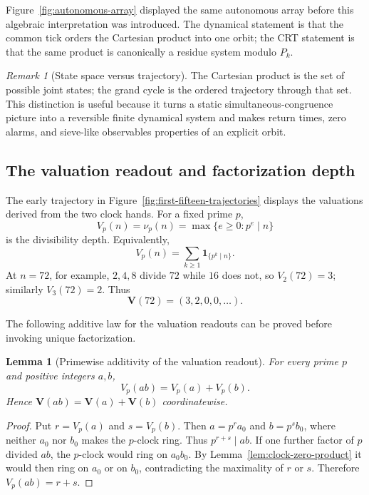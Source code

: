 \documentclass[11pt,a4paper]{article}
\theoremstyle{clockplain}
\newtheorem{lemma}[proposition]{Lemma}
\theoremstyle{definition}
\theoremstyle{remark}
\newtheorem{remark}[proposition]{Remark}
\newcommand{\V}{\mathbf V}
\begin{document}
Figure~\ref{fig:autonomous-array} displayed the same autonomous array before this algebraic interpretation was introduced. The dynamical statement is that the common tick orders the Cartesian product into one orbit; the CRT statement is that the same product is canonically a residue system modulo $P_k$.

\begin{remark}[State space versus trajectory]
The Cartesian product is the set of possible joint states; the grand cycle is the ordered trajectory through that set.  This distinction is useful because it turns a static simultaneous-congruence picture into a reversible finite dynamical system and makes return times, zero alarms, and sieve-like observables properties of an explicit orbit.
\end{remark}

\subsection{The valuation readout and factorization depth}
\label{sec:factorized-generation}

The early trajectory in Figure~\ref{fig:first-fifteen-trajectories} displays the valuations derived from the two clock hands. For a fixed prime $p$,
\[
V_p(n)=\nu_p(n)=\max\{e\ge0:p^e\mid n\}
\]
is the divisibility depth. Equivalently,
\begin{equation}
\boxed{V_p(n)=\sum_{k\ge1}\mathbf 1_{\{p^k\mid n\}}.}
\label{eq:valuation-depth}
\end{equation}
At $n=72$, for example, $2,4,8$ divide $72$ while $16$ does not, so $V_2(72)=3$; similarly $V_3(72)=2$. Thus
\[
\V(72)=(3,2,0,0,\ldots).
\]

The following additive law for the valuation readouts can be proved before invoking unique factorization.

\begin{lemma}[Primewise additivity of the valuation readout]
\label{lem:valuation-additive}
For every prime $p$ and positive integers $a,b$,
\begin{equation}
V_p(ab)=V_p(a)+V_p(b).
\label{eq:valuation-additive}
\end{equation}
Hence $\V(ab)=\V(a)+\V(b)$ coordinatewise.
\end{lemma}

\begin{proof}
Put $r=V_p(a)$ and $s=V_p(b)$. Then $a=p^r a_0$ and $b=p^s b_0$, where neither $a_0$ nor $b_0$ makes the $p$-clock ring. Thus $p^{r+s}\mid ab$. If one further factor of $p$ divided $ab$, the $p$-clock would ring on $a_0b_0$. By Lemma~\ref{lem:clock-zero-product} it would then ring on $a_0$ or on $b_0$, contradicting the maximality of $r$ or $s$. Therefore $V_p(ab)=r+s$.
\end{proof}
\end{document}
